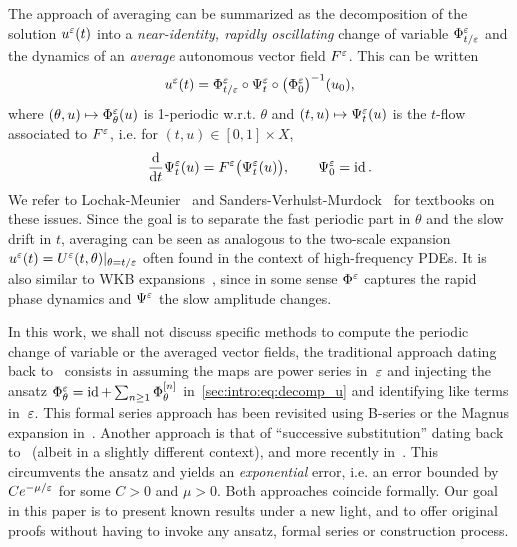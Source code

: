 %

The approach of averaging can be summarized as the decomposition of the
solution \( u^\varepsilon(t) \) into a \textit{near-identity, rapidly oscillating}
change of variable \(\Phi^\varepsilon_{t/\varepsilon} \) and the dynamics of an
\textit{average} autonomous vector field \( F^\varepsilon \). This can be written
\begin{equation} \label{sec:intro:eq:decomp_u}
  u^\varepsilon(t) = \Phi^\varepsilon_{t/\varepsilon} \circ \Psi^\varepsilon_t \circ 
    \big( \Phi^\varepsilon_0 \big)^{-1} (u_0), 
\end{equation}
where \( (\theta,u) \mapsto \Phi^\varepsilon_\theta(u) \) is 1-periodic w.r.t.
\( \theta \) and \( (t,u) \mapsto \Psi^\varepsilon_t(u) \) is the $t$-flow
associated to \( F^\varepsilon \), i.e. for $(t,u) \in [0,1] \times X$, 
\begin{equation}
  \frac{\mathrm{d}}{\mathrm{d} t} \Psi^\varepsilon_t(u) = F^\varepsilon \big( \Psi^\varepsilon_t(u) \big) ,
  \qquad \Psi^\varepsilon_0 = \operatorname{id} . 
\end{equation}
We refer to Lochak-Meunier~\cite{lochak.1988.multiphase} and
Sanders-Verhulst-Murdock~\cite{sanders.2007.averaging} for textbooks on
these issues. Since the goal is to separate the fast periodic part in
$\theta$ and the slow drift in $t$, averaging can be seen as analogous
to the two-scale expansion $u^\varepsilon(t) = U^\varepsilon(t, \theta) |_{\theta =
t/\varepsilon}$ often found in the context of high-frequency PDEs. It
is also similar to WKB expansions~\cite{wentzel.1926.eine,kramers.1926.wellenmechanik,brillouin.1926.remarques}, since in some sense $\Phi^\varepsilon$
captures the rapid phase dynamics and $\Psi^\varepsilon$ the slow amplitude
changes. 

In this work, we shall not discuss specific methods to compute the
periodic change of variable or the averaged vector fields, the traditional
approach dating back to~\cite{perko.1969.higher} consists in assuming the
maps are power series in~$\varepsilon$ and injecting the ansatz $\Phi^\varepsilon_\theta
= \operatorname{id} + \sum_{n \geq 1} \Phi^{[n]}_{\theta}$
in~\eqref{sec:intro:eq:decomp_u} and identifying like terms in~$\varepsilon$.
This formal series approach has been revisited using B-series or the
Magnus expansion in~\cite{chartier.2010.higher,
chartier.2012.formal, casas.2019.continuous}.
%
Another approach is that of ``successive substitution'' dating back
to~\cite{neishtadt.1984.separation} (albeit in a slightly different
context), and more recently in~\cite{castella.2015.stroboscopic,
chartier.2020.new}. This circumvents the ansatz and yields an
\textit{exponential} error, i.e. an error bounded by $Ce^{-\mu/\varepsilon}$
for some $C > 0$ and $\mu > 0$. Both approaches coincide formally. 
%
Our goal in this paper is to present known results under a new light,
and to offer original proofs without having to invoke any ansatz, formal
series or construction process. 

